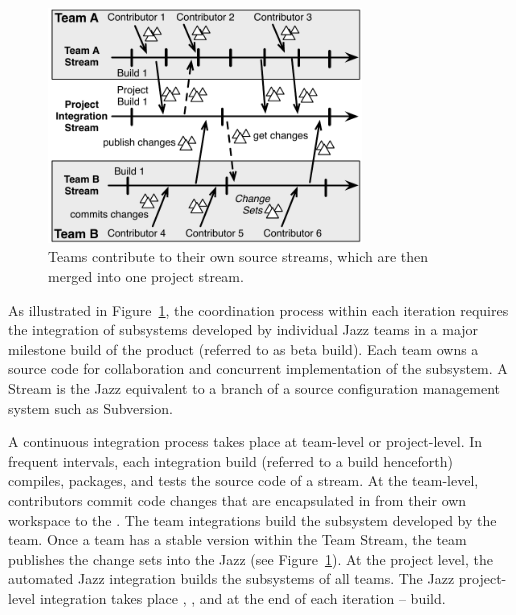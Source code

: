 \begin{figure}[t]
\begin{center}
\includegraphics[width=8.3cm]{figures/BuildResult}
\caption{Teams contribute to their own source streams, which are then merged into one project stream.}
\label{fig:BuildResult}
\end{center}
\end{figure}


As illustrated in Figure~\ref{fig:BuildResult}, the coordination process within
each iteration requires the integration of subsystems developed by individual
Jazz teams in a major milestone build of the product (referred to as beta build).
Each team owns a source code  for collaboration and concurrent
implementation of the subsystem. A Stream is the Jazz equivalent to a branch of a
source configuration management system such as Subversion.

A continuous integration process takes place at team-level or project-level. In
frequent intervals, each integration build (referred to a build henceforth)
compiles, packages, and tests the source code of a stream. At the team-level,
contributors commit code changes that are encapsulated in  from
their own workspace to the . The team integrations build the
subsystem developed by the team. Once a team has a stable version within the Team
Stream, the team publishes the change sets into the Jazz  (see Figure~\ref{fig:BuildResult}). At the project level, the automated
Jazz integration builds the subsystems of all teams. The Jazz project-level
integration takes place , , and at the end of each
iteration --  build.

